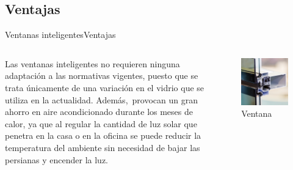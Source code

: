\documentclass[10pt]{beamer}
\begin{document}
\subsection{Ventajas}
\begin{frame}{Ventanas inteligentes}{Ventajas}
    
    \begin{columns}
    	\justify 
    	Las ventanas inteligentes  no requieren ninguna adaptación a las normativas vigentes, puesto que se trata únicamente de una variación en el vidrio que se utiliza en la actualidad. Además, provocan un gran ahorro en aire acondicionado durante los meses de calor, ya que al regular la cantidad de luz solar que penetra en la casa o en la oficina se puede reducir la temperatura del ambiente sin necesidad de bajar las persianas y encender la luz.

        \begin{figure}
        	\includegraphics[scale=0.2]{Imagenes/3}
        \caption{Ventana}
        \end{figure}
    \end{columns} 
\end{frame}
\end{document}
